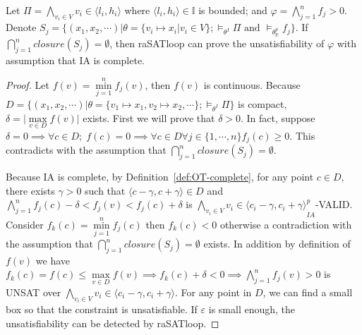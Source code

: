 \begin{theorem} \label{theorem:UNSAT-complete}
\sloppy
Let $\Pi = \bigwedge\limits_{v_i \in V} v_i \in \langle l_i, h_i \rangle$ where $\langle l_i, h_i \rangle \in \mathbb{I}$ is bounded; and ${\varphi = \bigwedge\limits_{j = 1}^n f_j > 0}$. Denote $S_j = \{(x_1, x_2, \cdots) | \theta = \{v_i \mapsto x_i | v_i \in V \};\models_{\theta^I} \Pi \text{ and } \models_{\theta^p_\mathbb{R}}f_j \}$. If $\bigcap\limits_{j = 1}^nclosure(S_j) = \emptyset$, then raSATloop can prove the unsatisfiability of $\varphi$ with assumption that IA is complete.
\end{theorem}


\begin{proof}
\sloppy
Let $f(v) = \min\limits_{j = 1}^nf_j(v)$, then $f(v)$ is continuous. Because ${D = \{(x_1, x_2, \cdots) | \theta = \{v_1 \mapsto x_1, v_2 \mapsto x_2, \cdots\}; \models_{\theta^I} \Pi\}}$ is compact, ${\delta = |\max\limits_{v \in D}f(v)}|$ exists. First we will prove that $\delta > 0$. In fact, suppose $\delta = 0 \implies \forall c \in D; \; f(c) = 0 \implies \forall c \in D \forall j \in \{1, \cdots, n\}f_j(c) \ge 0$. This contradicts with the assumption that $\bigcap\limits_{j = 1}^nclosure(S_j) = \emptyset$.

Because IA is complete, by Definition~\ref{def:OT-complete}, for any point $c \in D$, there exists $\gamma > 0$ such that $\langle c - \gamma, c + \gamma \rangle \in D$ and $\bigwedge\limits_{j = 1}^n f_j(c) - \delta < f_j(v) < f_j(c) + \delta$ is ${\bigwedge\limits_{v_i \in V}v_i \in \langle c_i - \gamma, c_i + \gamma \rangle}^p_{IA}$-VALID. Consider $f_k(c) = \min\limits_{j=1}^nf_j(c)$ then $f_k(c) < 0$ otherwise a contradiction with the assumption that $\bigcap\limits_{j = 1}^nclosure(S_j) = \emptyset$ exists. In addition by definition of $f(v)$ we have $f_k(c) = f(c) \le \max\limits_{v \in D}f(v) \implies f_k(c) + \delta < 0 \implies \bigwedge\limits_{j = 1}^n f_j(v) > 0$ is UNSAT over $\bigwedge\limits_{v_i \in V}v_i \in \langle c_i - \gamma, c_i + \gamma \rangle$. For any point in $D$, we can find a small box so that the constraint is unsatisfiable. If $\varepsilon$ is small enough, the unsatisfiability can be detected by raSATloop.
\end{proof}


